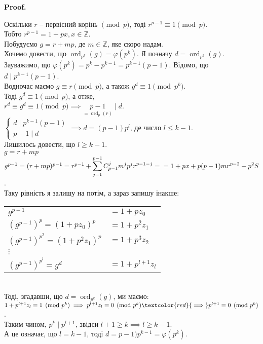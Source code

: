 \documentclass[a4paper, 14pt]{extarticle}
\makeatletter
\theoremstyle{theoremdd}
\theoremstyle{theoremdd}
\theoremstyle{theoremdd}
\theoremstyle{theoremdd}
\theoremstyle{theoremdd}
\theoremstyle{theoremdd}
\theoremstyle{theoremdd}
\theoremstyle{theoremdd}
\def\qed{$\blacksquare$}
\renewenvironment{proof}[1][Proof.\\]{\par
\pushQED{\hfill \qed}%
\normalfont \topsep6\p@\@plus6\p@\relax
\trivlist
\item\relax
{\bfseries
#1\@addpunct{.}}\hspace\labelsep\ignorespaces
}{%
\popQED\endtrivlist\@endpefalse
}
\DeclareMathOperator{\ord}{ord}
\makeatother
\begin{document}
\begin{proof}
Оскільки $r$ -- первісний корінь $\pmod p$, тоді $r^{p-1} \equiv 1 \pmod p$.\\
Тобто $r^{p-1} = 1 + px, x \in \mathbb{Z}$.\\
Побудуємо $g = r+mp$, де $m \in \mathbb{Z}$, яке скоро надам.\\
Хочемо довести, що $\ord_{p^k} (g) = \varphi(p^k)$. Я позначу $d =\ord_{p^k} (g)$.\\
Зауважимо, що $\varphi(p^k) = p^k - p^{k-1} = p^{k-1}(p-1)$.
Відомо, що $d \mid p^{k-1} (p-1)$.\\
Водночас маємо $g \equiv r \pmod p$, а також $g^d \equiv 1 \pmod {p^k}$.\\
Тоді $g^d \equiv 1 \pmod p$, а отже,\\
$r^d \equiv g^d \equiv 1 \pmod p \implies \underset{=\ord_p(r)}{p-1} \mid d$.\\
$\begin{cases} d \mid p^{k-1}(p-1) \\ p-1 \mid d \end{cases} \implies d = (p-1)p^l$, де число $l \leq k-1$.\\
Лишилось довести, що $l \geq k-1$.
\bigskip \\
$g = r + mp$\\
$g^{p-1} = (r+mp)^{p-1} = r^{p-1} + \displaystyle\sum_{j=1}^{p-1} C_{p-1}^j m^j p^j r^{p-1-j} = \\ = 1+px + p(p-1)mr^{p-2} + p^2S$.\\
Таку рівність я залишу на потім, а зараз запишу інакше:\\
\begin{tabular}{ll}
$g^{p-1}$ & $= 1 + pz_0$\\
$(g^{p-1})^p = (1+pz_0)^p$ & $= 1 + p^2z_1$\\
$(g^{p-1})^{p^2} = (1+p^2z_1)^p$ & $= 1 + p^3z_2$\\
$\vdots$ & \\
$(g^{p-1})^{p^l} = g^d$ & $= 1+p^{l+1}z_l$
\end{tabular}\\
Тоді, згадавши, що $d = \ord_{p^k} (g)$, ми маємо:\\
$1 + p^{l+1}z_l \equiv 1 \pmod {p^k} \implies p^{l+1}z_l \equiv 0 \pmod {p^k} \textcolor{red}{\implies} p^{l+1} \equiv 0 \pmod {p^k}$.\\
Таким чином, $p^k \mid p^{l+1}$, звідси $l+1 \geq k \implies l \geq k-1$.\\
А це означає, що $l=k-1$, тоді $d = p-1)p^{k-1} = \varphi(p^k)$.\\

\end{proof}
\end{document}
